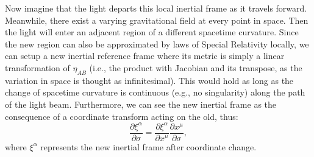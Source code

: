 \documentclass{article}
\begin{document}
Now imagine that the light departs this local inertial frame as it travels 
forward. Meanwhile, there exist a varying gravitational field at every 
point in space. Then the light will enter an adjacent region of a different 
spacetime curvature. Since the new region can also be approximated by laws 
of Special Relativity locally, we can setup a new inertial reference frame 
where its metric is simply a linear transformation of $\eta_{AB}$ (i.e., 
the product with Jacobian and its transpose, as the variation in space 
is thought as infinitesimal). This would hold as long as the change of 
spacetime curvature is continuous (e.g., no singularity) along the path 
of the light beam. Furthermore, we can see the new inertial frame as the 
consequence of a coordinate transform acting on the old, thus: 
\[
\frac{\partial \xi^\alpha}{\partial \sigma} = 
\frac{\partial \xi^\alpha}{\partial x^\mu} \frac{\partial x^\mu}{\partial \sigma},
\]
where $\xi^\alpha$ represents the new inertial frame after coordinate change.\\
\end{document}
